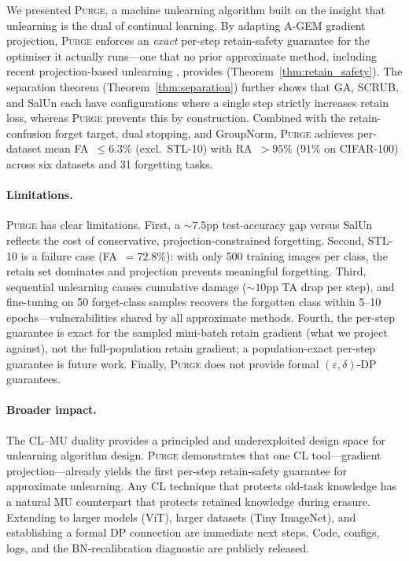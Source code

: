 \documentclass[letterpaper]{article} %
\newcommand{\ours}{\textsc{Purge}}
\begin{document}
We presented \ours{}, a machine unlearning algorithm built on the insight that unlearning is the dual of continual learning.
By adapting A-GEM gradient projection, \ours{} enforces an \emph{exact} per-step retain-safety guarantee for the optimiser it actually runs---one that no prior approximate method, including recent projection-based unlearning \citep{patel2025learning}, provides (Theorem~\ref{thm:retain_safety}).
The separation theorem (Theorem~\ref{thm:separation}) further shows that GA, SCRUB, and SalUn each have configurations where a single step strictly increases retain loss, whereas \ours{} prevents this by construction.
Combined with the retain-confusion forget target, dual stopping, and GroupNorm, \ours{} achieves per-dataset mean FA~$\le 6.3$\% (excl.\ STL-10) with RA~$> 95$\% (91\% on CIFAR-100) across six datasets and 31 forgetting tasks.

\paragraph{Limitations.}
\ours{} has clear limitations.
First, a ${\sim}7.5$pp test-accuracy gap versus SalUn reflects the cost of conservative, projection-constrained forgetting.
Second, STL-10 is a failure case (FA~$= 72.8$\%): with only 500 training images per class, the retain set dominates and projection prevents meaningful forgetting.
Third, sequential unlearning causes cumulative damage (${\sim}10$pp TA drop per step), and fine-tuning on 50 forget-class samples recovers the forgotten class within 5--10 epochs---vulnerabilities shared by all approximate methods.
Fourth, the per-step guarantee is exact for the sampled mini-batch retain gradient (what we project against), not the full-population retain gradient; a population-exact per-step guarantee is future work.
Finally, \ours{} does not provide formal $(\varepsilon,\delta)$-DP guarantees.

\paragraph{Broader impact.}
The CL--MU duality provides a principled and underexploited design space for unlearning algorithm design.
\ours{} demonstrates that one CL tool---gradient projection---already yields the first per-step retain-safety guarantee for approximate unlearning.
Any CL technique that protects old-task knowledge has a natural MU counterpart that protects retained knowledge during erasure.
Extending to larger models (ViT), larger datasets (Tiny ImageNet), and establishing a formal DP connection are immediate next steps.
Code, configs, logs, and the BN-recalibration diagnostic are publicly released.


\end{document}
